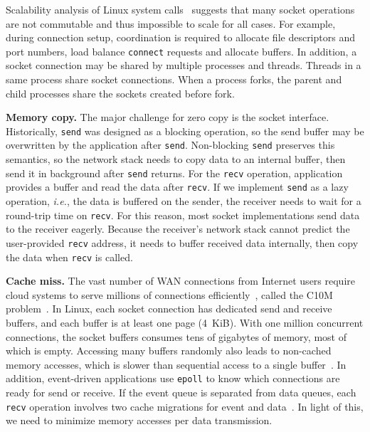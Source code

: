 Scalability analysis of Linux system calls~\cite{boyd2010analysis,clements2015scalable} suggests that many socket operations are not commutable and thus impossible to scale for all cases. For example, during connection setup, coordination is required to allocate file descriptors and port numbers, load balance \texttt{connect} requests and allocate buffers. In addition, a socket connection may be shared by multiple processes and threads. Threads in a same process share socket connections. When a process forks, the parent and child processes share the sockets created before fork.

\textbf{Memory copy.}
The major challenge for zero copy is the socket interface.
Historically, \texttt{send} was designed as a blocking operation, so the send buffer may be overwritten by the application after \texttt{send}.
Non-blocking \texttt{send} preserves this semantics, so the network stack needs to copy data to an internal buffer, then send it in background after \texttt{send} returns.
For the \texttt{recv} operation, application provides a buffer and read the data after \texttt{recv}.
If we implement \texttt{send} as a lazy operation, \textit{i.e.}, the data is buffered on the sender, the receiver needs to wait for a round-trip time on \texttt{recv}.
For this reason, most socket implementations send data to the receiver eagerly.
Because the receiver's network stack cannot predict the user-provided \texttt{recv} address, it needs to buffer received data internally, then copy the data when \texttt{recv} is called.

\textbf{Cache miss.}
The vast number of WAN connections from Internet users require cloud systems to serve millions of connections efficiently~\cite{nishtala2013scaling,lin2016scalable,belay2017ix}, called the C10M problem~\cite{graham2013c10m}. In Linux, each socket connection has dedicated send and receive buffers, and each buffer is at least one page (4~KiB). With one million concurrent connections, the socket buffers consumes tens of gigabytes of memory, most of which is empty. Accessing many buffers randomly also leads to non-cached memory accesses, which is slower than sequential access to a single buffer~\cite{li2017kv}. In addition, event-driven applications use \texttt{epoll} to know which connections are ready for send or receive. If the event queue is separated from data queues, each \texttt{recv} operation involves two cache migrations for event and data~\cite{yasukata2016stackmap}. In light of this, we need to minimize memory accesses per data transmission.


